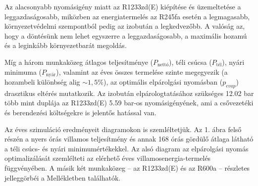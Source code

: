 \documentclass[12pt]{article}
\begin{document}
\begin{table}[htbp]
    \centering
    \label{tab:orc_annual_summary}
    \vspace{2mm}
    \renewcommand{\arraystretch}{1.3}
    \caption{Geotermikus ORC erőmű éves dinamikus szimulációjának összehasonlító eredményei (14 kútpár)}
\end{table}

Az alacsonyabb nyomásigény miatt az R1233zd(E) kiépítése és üzemeltetése 
a leggazdaságosabb, miközben az energiatermelés az R245fa esetén a legmagasabb, 
környezetvédelmi szempontból pedig az izobután a legkedvezőbb. A valóság az, hogy 
a döntésünk nem lehet egyszerre a leggazdaságosabb, a maximális hozamú és a leginkább 
környezetbarát megoldás.

Míg a három munkaközeg átlagos teljesítménye ($P_{\text{nettó}}$),
téli csúcsa ($P_{\text{tél}}$), nyári minimuma ($P_{\text{nyár}}$), valamint az éves összes termelése
szinte megegyezik (a hozambeli különbség alig $\sim 1{,}5\%$), az optimális elpárolgási nyomásban
($p_{evap}$) drasztikus eltérés mutatkozik. Az izobután elpárologtatásához szükséges 12.02 bar több mint duplája az R1233zd(E) 5.59 bar-os nyomásigényének,
ami a csővezetéki és berendezési költségekre is jelentős hatással van. 

Az éves szimuláció eredményeit diagramokon is szemléltetjük. Az 1. ábra felső részén a 
nyers órás villamos teljesítmény és annak 168 órás gördülő átlaga látható a téli csúcs- és 
nyári minimumértékekkel. Az alsó diagram az elpárolgási nyomás optimalizálását szemlélteti az 
elérhető éves villamosenergia-termelés függvényében. A másik két munkaközeg – az R1233zd(E) és az 
R600a – részletes jelleggörbéi a Mellékletben találhatók.
\end{document}
